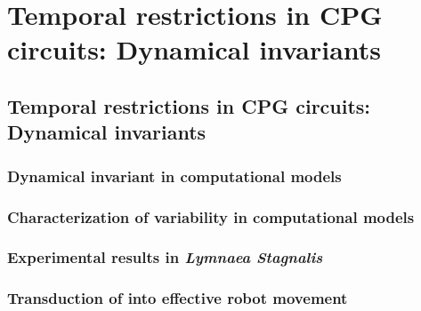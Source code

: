\chapter{Temporal restrictions in CPG circuits: Dynamical invariants}
\label{c-invariants}

\section{Temporal restrictions in CPG circuits: Dynamical invariants}
\subsection{Dynamical invariant in computational models}

\subsection{Characterization of variability in computational models}
\label{c-invariants-model}
\subsection{Experimental results in \textit{Lymnaea Stagnalis}}

\subsection{Transduction of into effective robot movement}

